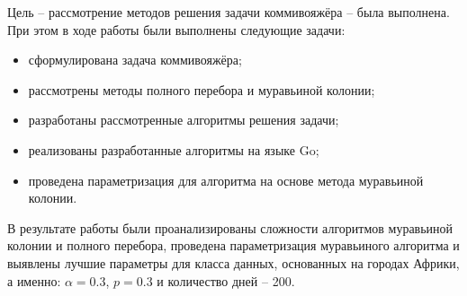 
Цель – рассмотрение методов решения задачи коммивояжёра – была выполнена.
При этом в ходе работы были выполнены следующие задачи:

\begin{itemize}
	\item сформулирована задача коммивояжёра;
	\item рассмотрены методы полного перебора и муравьиной колонии;
	\item разработаны рассмотренные алгоритмы решения задачи;
	\item реализованы разработанные алгоритмы на языке Go;
	\item проведена параметризация для алгоритма на основе метода муравьиной колонии. 
\end{itemize}

В результате работы были проанализированы сложности алгоритмов муравьиной колонии и полного перебора, проведена параметризация муравьиного алгоритма и выявлены лучшие параметры для класса данных, основанных на городах Африки, а именно: $\alpha = 0.3$, $p = 0.3$ и количество дней -- 200.